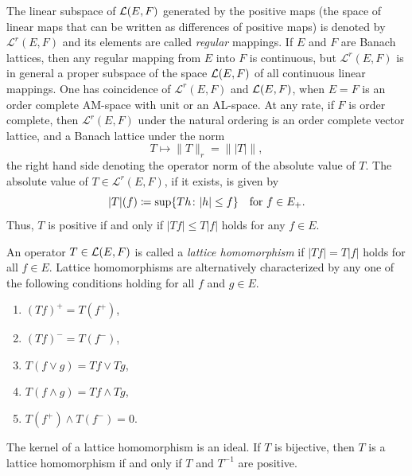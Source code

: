 The linear subspace of\/ $ \mathcal{L}(E,F) $ generated by the positive maps (\ie  the space of linear maps that can be written as differences of positive maps) is denoted by $ \mathcal{L}^{r}(E,F) $ and its elements are called \emph{regular} mappings.
If\/ $ E $ and $ F $ are Banach lattices, then any regular mapping from $ E $ into $ F $ is continuous, but  $ \mathcal{L}^{r}(E,F) $ is in general a proper subspace of the space $ \mathcal{L}(E,F) $ of all continuous linear mappings.
One has coincidence of\/ $ \mathcal{L}^{r}(E,F) $ and $ \mathcal{L}(E,F) $, \eg when $ E = F $ is an order complete AM-space with unit or an AL-space.
At any rate, if\/ $ F $ is order complete, then $ \mathcal{L}^{r}(E,F) $ under the natural ordering is an order complete vector lattice, and a Banach lattice under the norm
\[
	T \mapsto \|T\|_{r} = \| |T| \|,
\]
the right hand side denoting the operator norm of the absolute value of\/ $ T $.
The absolute value of\/ $ T \in  \mathcal{L}^{r}(E,F) $, if it exists, is given by
\[
	|T|(f) \coloneq \sup\{ Th \colon |h| \leq f \} \quad \text{for $ f \in E_{+} $} . 
\]
Thus, $ T $ is positive if and only if\/ $ |Tf| \leq T|f| $ holds for any $ f \in E $.

An operator $ T \in \mathcal{L}(E,F) $ is called a \emph{lattice homomorphism} if\/ $ |Tf| = T|f| $ holds for all $ f \in E $.
Lattice homomorphisms are alternatively characterized by any one of the following conditions holding for all $ f $ and $ g \in E $.
\begin{enumerate}[\upshape (i)]

    \item 
    $(Tf)^{+} = T(f^{+})$,
    
    \item 
    $(Tf)^{-} = T(f^{-})$,
    
    \item 
    $T(f\vee g) = Tf\vee Tg$,
    
    \item 
    $T(f\wedge g) = Tf\wedge Tg$,
    
    \item 
    $T(f^{+})\wedge T(f^{-}) = 0$.

\end{enumerate}
The kernel of a lattice homomorphism is an ideal.
If\/ $ T $ is bijective, then $ T $ is a lattice homomorphism if and only if\/ $ T $ and $ T^{-1} $ are positive.
